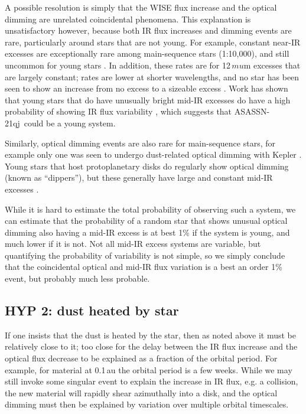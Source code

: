 \documentclass{aa}
\newcommand{\asas}{ASASSN-21qj}
\begin{document}
A possible resolution is simply that the WISE flux increase and the optical dimming are unrelated coincidental phenomena.
%
This explanation is unsatisfactory however, because both IR flux increases and dimming events are rare, particularly around stars that are not young.
%
For example, constant near-IR excesses are exceptionally rare among main-sequence stars (1:10,000), and still uncommon for young stars \citep[1:100][]{2013MNRAS.433.2334K}.
%
In addition, these rates are for 12$\,mu$m excesses that are largely constant; rates are lower at shorter wavelengths, and no star has been seen to show an increase from no excess to a sizeable excess \citep[][report a disappearing mid-IR excess, but this is the single example known]{2012Natur.487...74M}.
%
Work has shown that young stars that do have unusually bright mid-IR excesses do have a high probability of showing IR flux variability \citep{2015ApJ...805...77M}, which suggests that \asas~could be a young system.

Similarly, optical dimming events are also rare for main-sequence stars, for example only one was seen to undergo dust-related optical dimming with Kepler \citep{2016MNRAS.457.3988B}.
%
Young stars that host protoplanetary disks do regularly show optical dimming (known as ``dippers''), but these generally have large and constant mid-IR excesses \citep[e.g.][]{2016ApJ...816...69A}.

While it is hard to estimate the total probability of observing such a system, we can estimate that the probability of a random star that shows unusual optical dimming also having a mid-IR excess is at best 1\% if the system is young, and much lower if it is not.
%
Not all mid-IR excess systems are variable, but quantifying the probability of variability is not simple, so we simply conclude that the coincidental optical and mid-IR flux variation is a best an order 1\% event, but probably much less probable.

\subsection{HYP 2: dust heated by star}

If one insists that the dust is heated by the star, then as noted above it must be relatively close to it; too close for the delay between the IR flux increase and the optical flux decrease to be explained as a fraction of the orbital period.
%
For example, for material at 0.1\,au the orbital period is a few weeks.
%
While we may still invoke some singular event to explain the increase in IR flux, e.g. a collision, the new material will rapidly shear azimuthally into a disk, and the optical dimming must then be explained by variation over multiple orbital timescales.
\end{document}
